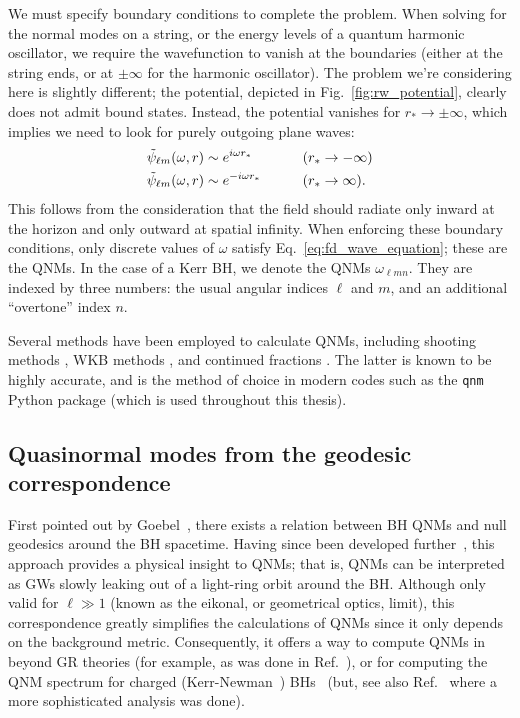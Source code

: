 We must specify boundary conditions to complete the problem. 
When solving for the normal modes on a string, or the energy levels of a quantum harmonic oscillator, we require the wavefunction to vanish at the boundaries (either at the string ends, or at $\pm \infty$ for the harmonic oscillator).
The problem we're considering here is slightly different; the potential, depicted in Fig.~\ref{fig:rw_potential}, clearly does not admit bound states. 
Instead, the potential vanishes for $r_* \rightarrow \pm \infty$, which implies we need to look for purely outgoing plane waves:
\begin{alignat}{2}
    &\tilde{\psi}_{\ell m}(\omega, r) \sim e^{i \omega r_*} \qquad &&\qty(r_* \rightarrow -\infty) \nonumber \\
    &\tilde{\psi}_{\ell m}(\omega, r) \sim e^{- i \omega r_*} \qquad &&\qty(r_* \rightarrow \infty).
\end{alignat}
This follows from the consideration that the field should radiate  only inward at the horizon and only outward at spatial infinity.
When enforcing these boundary conditions, only discrete values of $\omega$ satisfy Eq.~\ref{eq:fd_wave_equation}; these are the QNMs.
In the case of a Kerr BH, we denote the QNMs $\omega_{\ell m n}$.
They are indexed by three numbers: the usual angular indices $\ell$ and $m$, and an additional ``overtone'' index $n$.

Several methods have been employed to calculate QNMs, including shooting methods \cite{Chandrasekhar:1975zza}, WKB methods \cite{Schutz:1985km}, and continued fractions \cite{Leaver:1985ax}.
The latter is known to be highly accurate, and is the method of choice in modern codes such as the \texttt{qnm} Python package \cite{Stein:2019mop} (which is used throughout this thesis).


\subsection{Quasinormal modes from the geodesic correspondence}

First pointed out by Goebel~\cite{1972ApJ...172L..95G}, there exists a relation between BH QNMs and null geodesics around the BH spacetime.
Having since been developed further~\cite{Ferrari:1984zz, Mashhoon:1985cya, Cardoso:2008bp, Yang:2012he}, this approach provides a physical insight to QNMs; that is, QNMs can be interpreted as GWs slowly leaking out of a light-ring orbit around the BH. 
Although only valid for $\ell \gg 1$ (known as the eikonal, or geometrical optics, limit), this correspondence greatly simplifies the calculations of QNMs since it only depends on the background metric.
Consequently, it offers a way to compute QNMs in beyond GR theories (for example, as was done in Ref.~\cite{Blazquez-Salcedo:2016enn}), or for computing the QNM spectrum for charged (Kerr-Newman~\cite{Newman:1965my}) BHs~\cite{Cardoso:2016olt, Wang:2021uuh} (but, see also Ref.~\cite{Carullo:2021oxn} where a more sophisticated analysis was done).

